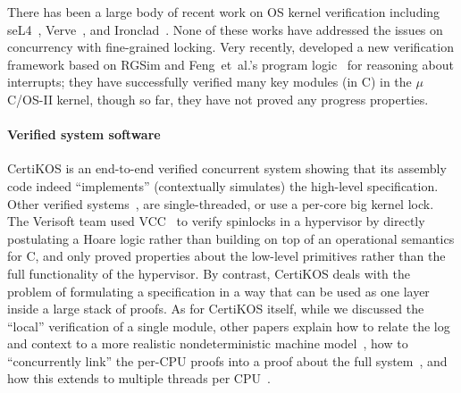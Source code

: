  There has been a large body
of recent work on OS kernel verification including
seL4~\cite{klein2009sel4,klein14},
Verve~\cite{hawblitzel10},
and Ironclad~\cite{ironclad14}. None of these works have addressed the
issues on concurrency with fine-grained locking. Very recently,
\citet{xu16} developed a new verification framework based on RGSim
and Feng~{et~al.}'s program logic~\cite{feng08:aim} for reasoning
about interrupts; they have successfully verified many key modules
(in C) in the $\mu$C/OS-II kernel, though so far, they have not proved
any progress properties.



\paragraph{Verified system software}
CertiKOS is an end-to-end verified concurrent system showing that its
assembly code indeed ``implements'' (contextually simulates) the
high-level specification.
Other verified systems~\cite{klein2009sel4,hawblitzel10,hawblitzel:ironclad},
are single-threaded, or use a per-core big kernel lock.
The Verisoft team used VCC~\cite{vcc09} to verify spinlocks in a
hypervisor by directly postulating a Hoare logic rather than building
on top of an operational semantics for C, and only proved properties
about the low-level primitives rather than the full functionality of
the hypervisor. By contrast, CertiKOS deals with the problem of
formulating a specification in a way that can be used as one layer
inside a large stack of proofs. As for CertiKOS itself, while we
discussed the ``local'' verification of a single module, other papers
explain how to relate the log and context to a more realistic
nondeterministic machine model~\cite{certikos16}, how to
``concurrently link'' the per-CPU proofs into a proof about the full
system~\cite{ccal16}, and how this extends to multiple threads per
CPU~\cite{ccal16}.

